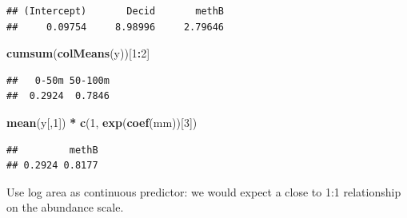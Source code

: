 \documentclass[12pt,]{book}
\newenvironment{Shaded}{\begin{snugshade}}{\end{snugshade}}
\newcommand{\DataTypeTok}[1]{\textcolor[rgb]{0.13,0.29,0.53}{#1}}
\newcommand{\DecValTok}[1]{\textcolor[rgb]{0.00,0.00,0.81}{#1}}
\newcommand{\FloatTok}[1]{\textcolor[rgb]{0.00,0.00,0.81}{#1}}
\newcommand{\KeywordTok}[1]{\textcolor[rgb]{0.13,0.29,0.53}{\textbf{#1}}}
\newcommand{\NormalTok}[1]{#1}
\newcommand{\OperatorTok}[1]{\textcolor[rgb]{0.81,0.36,0.00}{\textbf{#1}}}
\newcommand{\StringTok}[1]{\textcolor[rgb]{0.31,0.60,0.02}{#1}}
\begin{document}
\begin{verbatim}
## (Intercept)       Decid       methB 
##     0.09754     8.98996     2.79646
\end{verbatim}

\begin{Shaded}
\begin{Highlighting}[]
\KeywordTok{cumsum}\NormalTok{(}\KeywordTok{colMeans}\NormalTok{(y))[}\DecValTok{1}\OperatorTok{:}\DecValTok{2}\NormalTok{]}
\end{Highlighting}
\end{Shaded}

\begin{verbatim}
##   0-50m 50-100m 
##  0.2924  0.7846
\end{verbatim}

\begin{Shaded}
\begin{Highlighting}[]
\KeywordTok{mean}\NormalTok{(y[,}\DecValTok{1}\NormalTok{]) }\OperatorTok{*}\StringTok{ }\KeywordTok{c}\NormalTok{(}\DecValTok{1}\NormalTok{, }\KeywordTok{exp}\NormalTok{(}\KeywordTok{coef}\NormalTok{(mm))[}\DecValTok{3}\NormalTok{])}
\end{Highlighting}
\end{Shaded}

\begin{verbatim}
##         methB 
## 0.2924 0.8177
\end{verbatim}

Use log area as continuous predictor:
we would expect a close to 1:1 relationship on the
abundance scale.

\begin{Shaded}
\end{Shaded}
\end{document}
